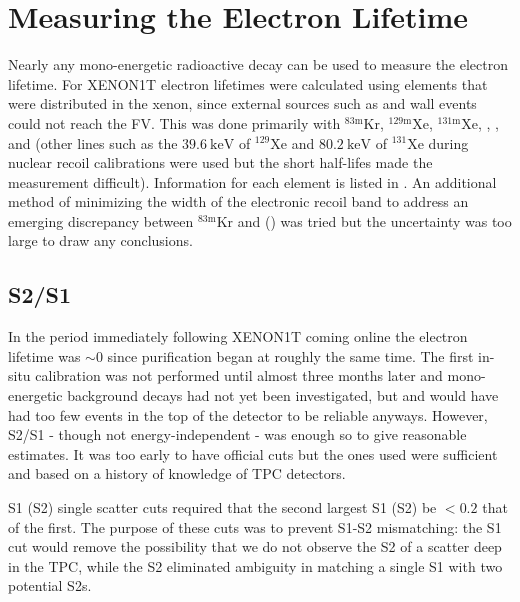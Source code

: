 \section{Measuring the Electron Lifetime}
\label{sec:electron_lifetime_measurements}
Nearly any mono-energetic radioactive decay can be used to measure the electron lifetime.  For XENON1T electron lifetimes were calculated
using elements that were distributed in the xenon, since external \gammaray sources such as  and
wall events could not reach the FV.  This was done primarily with $\mathrm{^{83m}Kr}$, $\mathrm{^{129m}Xe}$, $\mathrm{^{131m}Xe}$,
, , and  (other lines such as the $39.6\ \mathrm{keV}$ of $\mathrm{^{129}Xe}$ and
$80.2\ \mathrm{keV}$ of $\mathrm{^{131}Xe}$ during nuclear recoil calibrations were used but the short half-lifes made the measurement
difficult).  Information for each element is listed in .  An
additional method of minimizing the \stwob width of the
 electronic recoil band to address an emerging discrepancy between
$\mathrm{^{83m}Kr}$ and \alphadecays () was tried but the uncertainty was too large to
draw any conclusions.



\subsection{S2/S1}
\label{subsec:electron_lifetimes_measurement_ss}
In the period immediately following XENON1T coming online the electron lifetime was ${\sim} 0$ since purification began at roughly
the same time.  The first in-situ calibration was not performed until almost three months later and mono-energetic
background decays had not yet been investigated, but  and  would have had too few events in the top of the
detector to be reliable anyways.  However,
S2/S1 - though not energy-independent - was enough so to give reasonable estimates.  It was too early to have official cuts but
the ones used were sufficient and based on a history of knowledge of TPC detectors.

S1 (S2) single scatter cuts required that the second largest S1 (S2) be $< 0.2$ that of the first.  The purpose of these cuts was to
prevent S1-S2 mismatching: the S1 cut would
remove the possibility that we do not observe the S2 of a scatter deep in the TPC, while the S2 eliminated ambiguity in matching a single
S1 with two potential S2s.

